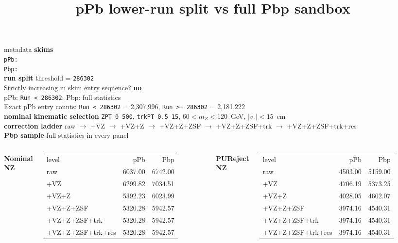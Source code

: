 \documentclass[aspectratio=169]{beamer}
\title{pPb lower-run split vs full Pbp sandbox}
\date{}
\begin{document}
\begin{frame}
  \titlepage
\end{frame}

\begin{frame}[t]{metadata}
  \tiny
  \textbf{skims}\\
  \texttt{pPb: }\\
  \texttt{Pbp: }\\
  \vspace{0.35em}
  \textbf{run split} threshold = \texttt{286302}\\
  Strictly increasing in skim entry sequence? \textbf{no}\\
  pPb: \texttt{Run < 286302}; Pbp: full statistics\\
  Exact pPb entry counts: \texttt{Run < 286302} = 2,307,996, \texttt{Run >= 286302} = 2,181,222\\
  \vspace{0.35em}
  \textbf{nominal kinematic selection} \texttt{ZPT 0\_500}, \texttt{trkPT 0.5\_15}, $60 < m_Z < 120$~GeV, $|v_z| < 15$~cm\\
  \textbf{correction ladder} raw $\to$ +VZ $\to$ +VZ+Z $\to$ +VZ+Z+ZSF $\to$ +VZ+Z+ZSF+trk $\to$ +VZ+Z+ZSF+trk+res\\
  \textbf{Pbp sample} full statistics in every panel\\
  \vspace{0.4em}
  \begin{columns}[t,onlytextwidth]
    \centering
    \textbf{Nominal NZ}\\[-0.2em]
    \scriptsize
    \begin{tabular}{lrr}
      level & pPb & Pbp \\
raw & 6037.00 & 6742.00 \\
+VZ & 6299.82 & 7034.51 \\
+VZ+Z & 5392.23 & 6023.99 \\
+VZ+Z+ZSF & 5320.28 & 5942.57 \\
+VZ+Z+ZSF+trk & 5320.28 & 5942.57 \\
+VZ+Z+ZSF+trk+res & 5320.28 & 5942.57 \\
    \end{tabular}
    \centering
    \textbf{PUReject NZ}\\[-0.2em]
    \scriptsize
    \begin{tabular}{lrr}
      level & pPb & Pbp \\
raw & 4503.00 & 5159.00 \\
+VZ & 4706.19 & 5373.25 \\
+VZ+Z & 4028.05 & 4602.07 \\
+VZ+Z+ZSF & 3974.16 & 4540.31 \\
+VZ+Z+ZSF+trk & 3974.16 & 4540.31 \\
+VZ+Z+ZSF+trk+res & 3974.16 & 4540.31 \\
    \end{tabular}
  \end{columns}
\end{frame}
\end{document}

